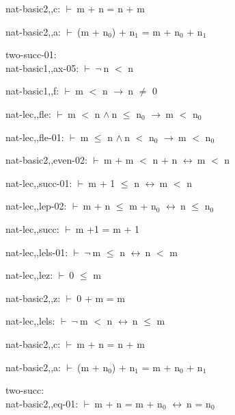 \documentclass[a4paper]{article}
\newcommand{\Fol}{\mbox{$\vdash\ $}}
\newcommand{\Not}{\mbox{$\neg\ $}}
\newcommand{\And}{\mbox{$\wedge\ $}}
\newcommand{\Imp}{\mbox{$\rightarrow\ $}}
\newcommand{\Equiv}{\mbox{$\leftrightarrow\ $}}
\begin{document}
nat-basic2,,c: 
 \Fol m + n = n + m



nat-basic2,,a: 
 \Fol (m + $\mbox{n}_{0}$) + $\mbox{n}_{1}$ = m + $\mbox{n}_{0}$ + $\mbox{n}_{1}$



\bigskip

two-succ-01:\\ nat-basic1,,ax-05: 
 \Fol \Not n $<$ n



nat-basic1,,f: 
 \Fol m $<$ n \Imp n $\neq$ 0



nat-lec,,fle: 
 \Fol m $<$ n \And n $\le$ $\mbox{n}_{0}$ \Imp m $<$ $\mbox{n}_{0}$



nat-lec,,fle-01: 
 \Fol m $\le$ n \And n $<$ $\mbox{n}_{0}$ \Imp m $<$ $\mbox{n}_{0}$



nat-basic2,,even-02: 
 \Fol m + m $<$ n + n \Equiv m $<$ n



nat-lec,,succ-01: 
 \Fol m + 1 $\le$ n \Equiv m $<$ n



nat-lec,,lep-02: 
 \Fol m + n $\le$ m + $\mbox{n}_{0}$ \Equiv n $\le$ $\mbox{n}_{0}$



nat-lec,,succ: 
 \Fol m +1 = m + 1



nat-lec,,lels-01: 
 \Fol \Not m $\le$ n \Equiv n $<$ m



nat-lec,,lez: 
 \Fol 0 $\le$ m



nat-basic2,,z: 
 \Fol 0 + m = m



nat-lec,,lels: 
 \Fol \Not m $<$ n \Equiv n $\le$ m



nat-basic2,,c: 
 \Fol m + n = n + m



nat-basic2,,a: 
 \Fol (m + $\mbox{n}_{0}$) + $\mbox{n}_{1}$ = m + $\mbox{n}_{0}$ + $\mbox{n}_{1}$



\bigskip

two-succ:\\ nat-basic2,,eq-01: 
 \Fol m + n = m + $\mbox{n}_{0}$ \Equiv n = $\mbox{n}_{0}$
\end{document}
